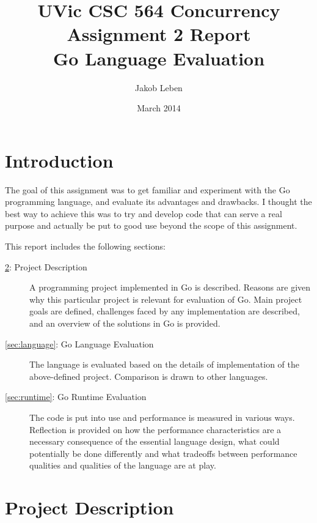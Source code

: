 \documentclass {article}
\begin{document}
\title{UVic CSC 564 Concurrency\\Assignment 2 Report\\Go Language Evaluation}
\author{Jakob Leben}
\date{March 2014}
\maketitle


\section{Introduction}

The goal of this assignment was to get familiar and experiment with the Go programming language, and evaluate its advantages and drawbacks. I thought the best way to achieve this was to try and develop code that can serve a real purpose and actually be put to good use beyond the scope of this assignment.

This report includes the following sections:

\begin{description}

\item[\ref{sec:project}: Project Description] A programming project implemented in Go is described. Reasons are given why this particular project is relevant for evaluation of Go. Main project goals are defined, challenges faced by any implementation are described, and an overview of the solutions in Go is provided.

\item[\ref{sec:language}: Go Language Evaluation] The language is evaluated based on the details of implementation of the above-defined project. Comparison is drawn to other languages.

\item[\ref{sec:runtime}: Go Runtime Evaluation] The code is put into use and performance is measured in various ways. Reflection is provided on how the performance characteristics are a necessary consequence of the essential language design, what could potentially be done differently and what tradeoffs between performance qualities and qualities of the language are at play.

\end{description}

\section{Project Description}
\label{sec:project}
\end{document}
